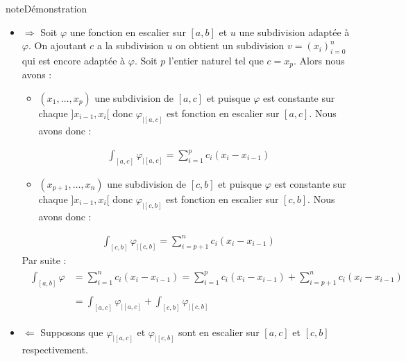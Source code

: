 \documentclass[letterpaper,10pt,french]{jupyterBook}
\begin{document}
\begin{sphinxadmonition}{note}{Démonstration}
\begin{itemize}
\item {} 
\sphinxAtStartPar
\(\Rightarrow\)
Soit \(\varphi\) une fonction en escalier sur \([a, b]\) et \(u\) une subdivision adaptée à \(\varphi\). On ajoutant \(c\) a la subdivision \(u\) on obtient un subdivision \(v=(x_i)_{i=0}^n\) qui est encore adaptée à \(\varphi\). Soit \(p\) l’entier naturel tel que \(c=x_p\). Alors nous avons :
\begin{itemize}
\item {} 
\sphinxAtStartPar
\((x_1, \ldots, x_p)\) une subdivision de  \([a, c]\) et puisque \(\varphi\) est constante sur chaque \(]x_{i-1}, x_{i}[\) donc \(\varphi_{|[a, c]}\) est fonction en escalier sur \([a, c]\). Nous avons donc :

\end{itemize}
\begin{equation*}
\begin{split}
    \int_{[a, c]}\varphi_{|[a, c]} = \sum_{i=1}^{p} c_i(x_i-x_{i-1})
    \end{split}
\end{equation*}\begin{itemize}
\item {} 
\sphinxAtStartPar
\((x_{p+1}, \ldots, x_n)\) une subdivision de  \([c, b]\) et puisque \(\varphi\) est constante sur chaque \(]x_{i-1}, x_{i}[\) donc \(\varphi_{|[c, b]}\) est fonction en escalier sur \([c, b]\). Nous avons donc :

\end{itemize}
\begin{equation*}
\begin{split}
    \int_{[c, b]}\varphi_{|[c, b]} = \sum_{i=p+1}^{n} c_i(x_i-x_{i-1})
    \end{split}
\end{equation*}
\sphinxAtStartPar
Par suite :
\begin{equation*}
\begin{split}
    \begin{aligned}
    \int_{[a, b]}\varphi &= \sum_{i=1}^{n} c_i(x_i-x_{i-1})=\sum_{i=1}^{p} c_i(x_i-x_{i-1}) + \sum_{i=p+1}^{n} c_i(x_i-x_{i-1}) \\ \\ 
     &= \int_{[a, c]}\varphi_{|[a, c]} + \int_{[c, b]}\varphi_{|[c, b]}
    \end{aligned}
    \end{split}
\end{equation*}
\end{itemize}
\begin{itemize}
\item {} 
\sphinxAtStartPar
\(\Leftarrow\)
Supposons que \(\varphi_{|[a, c]}\) et \(\varphi_{|[c, b]}\) sont en escalier sur \([a, c]\) et \([c, b]\) respectivement.


\end{itemize}
\end{sphinxadmonition}
\end{document}
